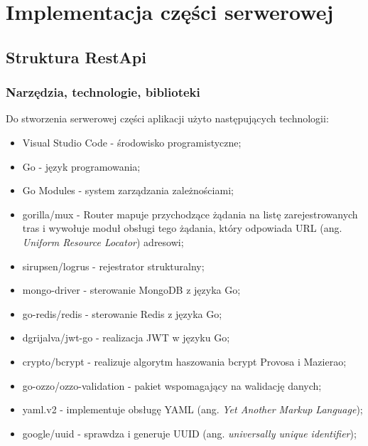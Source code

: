 \section{Implementacja części serwerowej}
% 
\subsection{Struktura RestApi}
% 
\subsubsection{Narzędzia, technologie, biblioteki}
Do stworzenia serwerowej części aplikacji użyto następujących technologii:
\begin{itemize}
\item Visual Studio Code - środowisko programistyczne;
\item Go - język programowania;
\item Go Modules - system zarządzania zależnościami;
\item gorilla/mux - Router mapuje przychodzące żądania na listę zarejestrowanych tras i wywołuje moduł obsługi tego żądania, który odpowiada URL (ang. \textit{Uniform Resource Locator}) adresowi;
\item sirupsen/logrus - rejestrator strukturalny;
\item mongo-driver - sterowanie MongoDB z języka Go;
\item go-redis/redis - sterowanie Redis z języka Go;
\item dgrijalva/jwt-go - realizacja JWT w języku Go;
\item crypto/bcrypt - realizuje algorytm haszowania bcrypt Provosa i Mazierao;
\item go-ozzo/ozzo-validation - pakiet wspomagający na walidację danych;
\item yaml.v2 - implementuje obsługę YAML (ang. \textit{Yet Another Markup Language});
\item google/uuid - sprawdza i generuje UUID (ang. \textit{universally unique identifier});
\end{itemize}

% 
